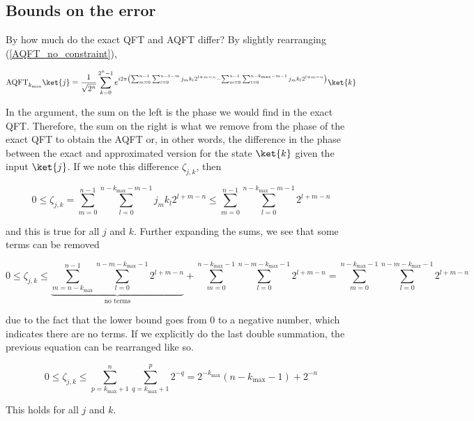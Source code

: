 
\subsection{Bounds on the error}
By how much do the exact QFT and AQFT differ? By slightly rearranging (\ref{AQFT_no_constraint}),

\begin{equation*}
    \text{AQFT}_{k_{\text{max}}}\ket{j} = \frac{1}{\sqrt{2^n}}\sum_{k=0}^{2^n-1}e^{i2\pi \left(\sum_{m=0}^{n-1}\sum_{l=0}^{n-1-m}j_mk_l2^{l+m-n} - \sum_{m=0}^{n-1}\sum_{l=0}^{n-k_{\text{max}}-m-1}j_mk_l2^{l+m-n}\right)}\ket{k}
\end{equation*}

In the argument, the sum on the left is the phase we would find in the exact QFT. Therefore, the sum on the right is what we remove from the phase of the exact QFT to obtain the AQFT or, in other words, the difference in the phase between the exact and approximated version for the state $\ket{k}$ given the input $\ket{j}$. If we note this difference $\zeta_{j,k}$, then 

\begin{equation*}
    0 \leq \zeta_{j,k} = \sum_{m=0}^{n-1}\sum_{l=0}^{n-k_{\text{max}}-m-1}j_mk_l2^{l+m-n} \leq \sum_{m=0}^{n-1}\sum_{l=0}^{n-k_{\text{max}}-m-1}2^{l+m-n}
\end{equation*}

and this is true for all $j$ and $k$. Further expanding the sums, we see that some terms can be removed

\begin{equation*}
    0 \leq \zeta_{j,k} \leq \underbrace{\sum_{m=n-k_{\text{max}}}^{n-1}\sum_{l=0}^{n-m-k_{\text{max}}-1} 2^{l+m-n}}_{\text{no terms}} + \sum_{m=0}^{n-k_{\text{max}}-1}\sum_{l=0}^{n-m-k_{\text{max}}-1}2^{l+m-n} = \sum_{m=0}^{n-k_{\text{max}}-1}\sum_{l=0}^{n-m-k_{\text{max}}-1}2^{l+m-n} 
\end{equation*}

due to the fact that the lower bound goes from 0 to a negative number, which indicates there are no terms. If we explicitly do the last double summation, the previous equation can be rearranged like so.

\begin{equation}
    0 \leq \zeta_{j,k} \leq \sum_{p=k_{\text{max}}+1}^{n}\sum_{q =k_{\text{max}}+1}^{p} 2^{-q} = 2^{-k_{\text{max}}}\left(n - k_{\text{max}}-1 \right) + 2^{-n}
    \label{diff_inequality}
\end{equation}

This holds for all $j$ and $k$.












